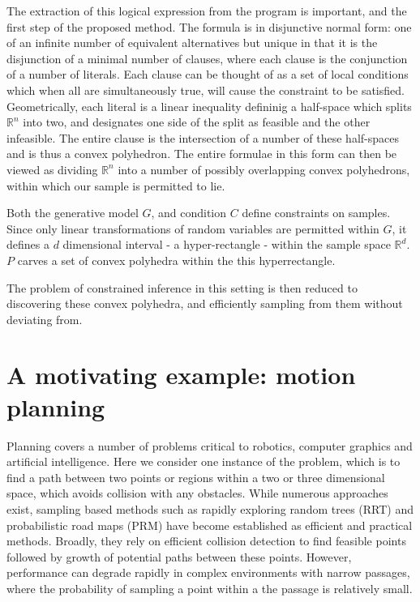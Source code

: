 The extraction of this logical expression from the program is important, and the first step of the proposed method.
The formula is in disjunctive normal form: one of an infinite number of equivalent alternatives but unique in that it is the disjunction of a minimal number of clauses, where each clause is the conjunction of a number of literals.
Each clause can be thought of as a set of local conditions which when all are simultaneously true, will cause the constraint to be satisfied.
Geometrically, each literal is a linear inequality defininig a half-space which splits $\mathbb{R}^n$ into two, and designates one side of the split as feasible and the other infeasible.
The entire clause is the intersection of a number of these half-spaces and is thus a convex polyhedron.
The entire formulae in this form can then be viewed as dividing $\mathbb{R}^n$ into a number of possibly overlapping convex polyhedrons, within which our sample is permitted to lie.

Both the generative model $G$, and condition $C$ define constraints on samples.
Since only linear transformations of random variables are permitted within $G$, it defines a $d$ dimensional interval - a hyper-rectangle - within the sample space $\mathbb{R}^d$.
$P$ carves a set of convex polyhedra within the this hyperrectangle.

The problem of constrained inference in this setting is then reduced to discovering these convex polyhedra, and efficiently sampling from them without deviating from.

\section{A motivating example: motion planning}
Planning covers a number of problems critical to robotics, computer graphics and artificial intelligence.
Here we consider one instance of the problem, which is to find a path between two points or regions within a two or three dimensional space, which avoids collision with any obstacles.
While numerous approaches exist, sampling based methods such as rapidly exploring random trees (RRT) and probabilistic road maps (PRM) have become established as efficient and practical methods.
Broadly, they rely on efficient collision detection to find feasible points followed by growth of potential paths between these points.
However, performance can degrade rapidly in complex environments with narrow passages, where the probability of sampling a point within a the passage is relatively small.

